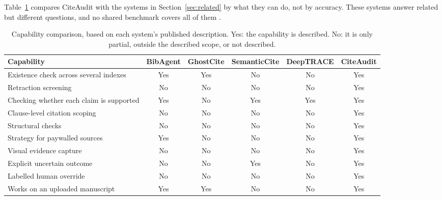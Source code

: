 \documentclass{article}
\begin{document}
Table~\ref{tab:compare} compares CiteAudit with the systems in Section~\ref{sec:related} by what they can do, not by accuracy. These systems answer related but different questions, and no shared benchmark covers all of them \cite{thorne2018,wadden2020,vladika2023}.

\begin{table}[htbp]
\centering

\caption{
Capability comparison, based on each system's published description. Yes: the capability is described. No: it is only partial, outside the described scope, or not described.
}

\label{tab:compare}

\small

\setlength{\tabcolsep}{4pt}

\begin{tabular}{@{}l c c c c c@{}}

\toprule

\textbf{Capability}
&
\textbf{BibAgent}
&
\textbf{GhostCite}
&
\textbf{SemanticCite}
&
\textbf{DeepTRACE}
&
\textbf{CiteAudit}
\\

\midrule

Existence check across several indexes
&
Yes & Yes & No & No & Yes
\\

Retraction screening
&
No & No & No & No & Yes
\\

Checking whether each claim is supported
&
Yes & No & Yes & Yes & Yes
\\

Clause-level citation scoping
&
No & No & No & No & Yes
\\

Structural checks
&
No & No & No & No & Yes
\\

Strategy for paywalled sources
&
Yes & No & No & No & Yes
\\

Visual evidence capture
&
No & No & No & No & Yes
\\

Explicit uncertain outcome
&
No & No & Yes & No & Yes
\\

Labelled human override
&
No & No & No & No & Yes
\\

Works on an uploaded manuscript
&
Yes & Yes & No & No & Yes
\\

\bottomrule

\end{tabular}

\end{table}
\end{document}

